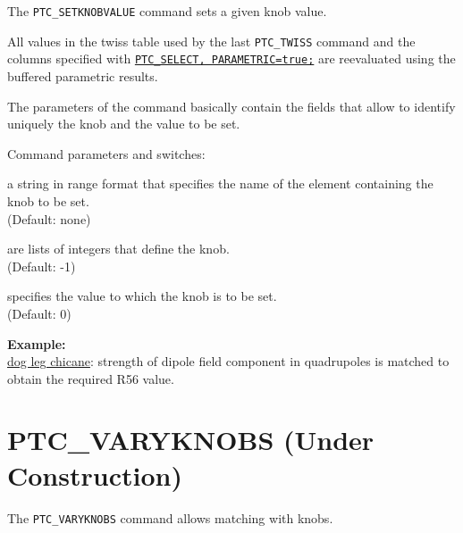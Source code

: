The \texttt{PTC\_SETKNOBVALUE} command sets a given knob value.


All values in the twiss table used by the last \texttt{PTC\_TWISS}
command and the columns specified with
\hyperref[sec:ptc-select]{\texttt{PTC\_SELECT, PARAMETRIC=true;}}  are
reevaluated using the buffered parametric results.

The parameters of the command basically contain the fields that allow
to identify uniquely the knob and the value to be set.

Command parameters and switches:
\begin{madlist}
    a string in range format that specifies the name
   of the element containing the knob to be set. \\
     (Default: none) 

    are lists of integers that define the knob.\\
   (Default: -1)   

    specifies the value to which the knob is to be set.\\
   (Default: 0)
\end{madlist}

\textbf{Example:}\\
\href{http://cern.ch/frs/mad-X_examples/ptc_madx_interface/matchknobs/matchknobs.madx}{dog
  leg chicane}: strength of dipole field component in quadrupoles is
matched to obtain the required R56 value.    


% 


\section{PTC\_VARYKNOBS (Under Construction)}
\label{sec:ptc-varyknobs}

The \texttt{PTC\_VARYKNOBS} command allows matching with \ptc knobs.


